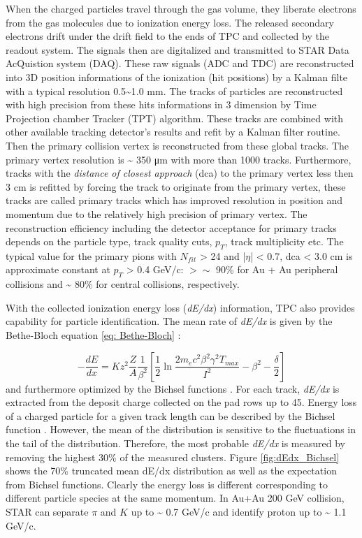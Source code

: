 When the charged particles travel through the gas volume, they liberate
electrons from the gas molecules due to ionization energy loss. The
released secondary electrons drift under the drift field to the ends
of TPC and collected by the readout system. The signals then are digitalized
and transmitted to STAR Data AcQuistion system (DAQ). These raw signals
(ADC and TDC) are reconstructed into 3D position informations of the
ionization (hit positions) by a Kalman filte with a typical resolution
0.5\textasciitilde{}1.0 mm. The tracks of particles are reconstructed
with high precision from these hits informations in 3 dimension by
Time Projection chamber Tracker (TPT) algorithm. These tracks are
combined with other available tracking detector's results and refit
by a Kalman filter routine. Then the primary collision vertex is reconstructed
from these global tracks. The primary vertex resolution is \textasciitilde{}
350 μm with more than 1000 tracks. Furthermore, tracks with the \emph{distance
of closest approach} (dca) to the primary vertex less then 3 cm is
refitted by forcing the track to originate from the primary vertex,
these tracks are called primary tracks which has improved resolution
in position and momentum due to the relatively high precision of primary
vertex. The reconstruction efficiency including the detector acceptance
for primary tracks depends on the particle type, track quality cuts,
$p_{T}$, track multiplicity etc. The typical value for the primary
pions with $N_{fit}$ > 24 and |$\eta$| < 0.7, dca < 3.0 cm is approximate
constant at $p_{T}$ > 0.4 GeV/c: $>\sim$ 90\% for Au + Au peripheral
collisions and \textasciitilde{} 80\% for central collisions, respectively.

With the collected ionization energy loss (\emph{dE/dx}) information,
TPC also provides capability for particle identification. The mean
rate of \emph{dE/dx }is given by the Bethe-Bloch equation \ref{eq: Bethe-Bloch}
\cite{Eidelman20041}:

\begin{equation}
-\frac{dE}{dx}=Kz^{2}\frac{Z}{A}\frac{1}{\beta^{2}}\left[\frac{1}{2}\ln\frac{2m_{e}c^{2}\beta^{2}\gamma^{2}T_{max}}{I^{2}}-\beta^{2}-\frac{\delta}{2}\right]\label{eq: Bethe-Bloch}
\end{equation}
and furthermore optimized by the Bichsel functions \cite{Bichsel2006154}.
For each track, \emph{dE/dx }is extracted from the deposit charge
collected on the pad rows up to 45. Energy loss of a charged particle
for a given track length can be described by the Bichsel function
\cite{Bichsel2006154}. However, the mean of the distribution is sensitive
to the fluctuations in the tail of the distribution. Therefore, the
most probable \emph{dE/dx} is measured by removing the highest 30\%
of the measured clusters. Figure \ref{fig:dEdx_Bichsel} shows the
70\% truncated mean dE/dx distribution as well as the expectation
from Bichsel functions. Clearly the energy loss is different corresponding
to different particle species at the same momentum. In Au+Au 200 GeV
collision, STAR can separate $\pi$ and $K$ up to \textasciitilde{}
0.7 GeV/c and identify proton up to \textasciitilde{} 1.1 GeV/c.

